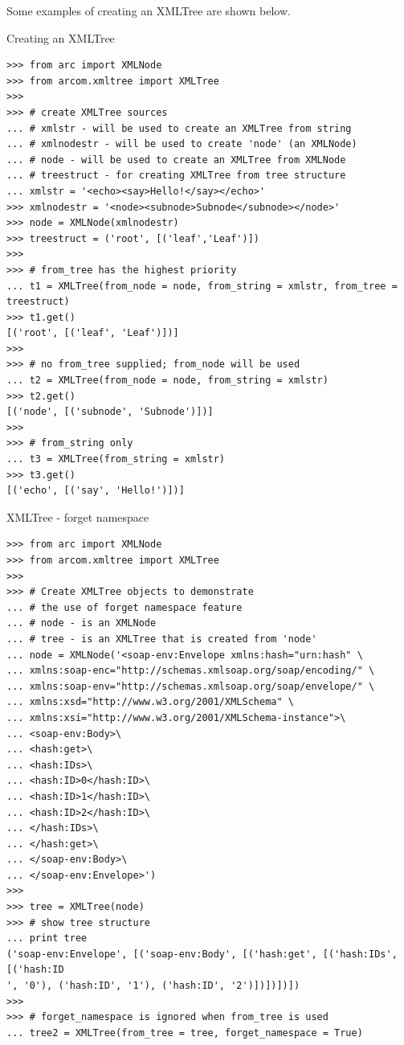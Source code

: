 \documentclass{article}
\begin{document}
\begin{flushleft}
\begin{itemize}
{\begin{itemize}
{      }
    \end{itemize}
    Some examples of creating an XMLTree are shown below.
    \begin{example}
      \caption{Creating an XMLTree}\label{crxt}
\begin{verbatim}
>>> from arc import XMLNode
>>> from arcom.xmltree import XMLTree
>>> 
>>> # create XMLTree sources
... # xmlstr - will be used to create an XMLTree from string
... # xmlnodestr - will be used to create 'node' (an XMLNode)
... # node - will be used to create an XMLTree from XMLNode
... # treestruct - for creating XMLTree from tree structure
... xmlstr = '<echo><say>Hello!</say></echo>'
>>> xmlnodestr = '<node><subnode>Subnode</subnode></node>'
>>> node = XMLNode(xmlnodestr)
>>> treestruct = ('root', [('leaf','Leaf')])
>>> 
>>> # from_tree has the highest priority
... t1 = XMLTree(from_node = node, from_string = xmlstr, from_tree = treestruct) 
>>> t1.get()
[('root', [('leaf', 'Leaf')])]
>>> 
>>> # no from_tree supplied; from_node will be used
... t2 = XMLTree(from_node = node, from_string = xmlstr)
>>> t2.get()
[('node', [('subnode', 'Subnode')])]
>>> 
>>> # from_string only
... t3 = XMLTree(from_string = xmlstr)
>>> t3.get()
[('echo', [('say', 'Hello!')])]
\end{verbatim}
    \end{example}
    \begin{example}
      \caption{XMLTree - forget namespace}\label{xtfn}
\begin{verbatim}
>>> from arc import XMLNode
>>> from arcom.xmltree import XMLTree
>>> 
>>> # Create XMLTree objects to demonstrate
... # the use of forget namespace feature
... # node - is an XMLNode
... # tree - is an XMLTree that is created from 'node'
... node = XMLNode('<soap-env:Envelope xmlns:hash="urn:hash" \
... xmlns:soap-enc="http://schemas.xmlsoap.org/soap/encoding/" \
... xmlns:soap-env="http://schemas.xmlsoap.org/soap/envelope/" \
... xmlns:xsd="http://www.w3.org/2001/XMLSchema" \
... xmlns:xsi="http://www.w3.org/2001/XMLSchema-instance">\
... <soap-env:Body>\
... <hash:get>\
... <hash:IDs>\
... <hash:ID>0</hash:ID>\
... <hash:ID>1</hash:ID>\
... <hash:ID>2</hash:ID>\
... </hash:IDs>\
... </hash:get>\
... </soap-env:Body>\
... </soap-env:Envelope>')
>>> 
>>> tree = XMLTree(node)
>>> # show tree structure
... print tree
('soap-env:Envelope', [('soap-env:Body', [('hash:get', [('hash:IDs', [('hash:ID
', '0'), ('hash:ID', '1'), ('hash:ID', '2')])])])])
>>> 
>>> # forget_namespace is ignored when from_tree is used
... tree2 = XMLTree(from_tree = tree, forget_namespace = True)

\end{verbatim}
\end{example}}
\end{itemize}
\end{flushleft}
\end{document}
